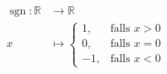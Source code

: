 \begin{align*}
	\operatorname{sgn} \colon \mathbb{R} &\longrightarrow \mathbb{R} \\
	x &\longmapsto
		\begin{cases}
			1, & \text{falls } x > 0 \\
			0, & \text{falls } x = 0 \\
			-1, & \text{falls } x < 0
		\end{cases}
\end{align*}